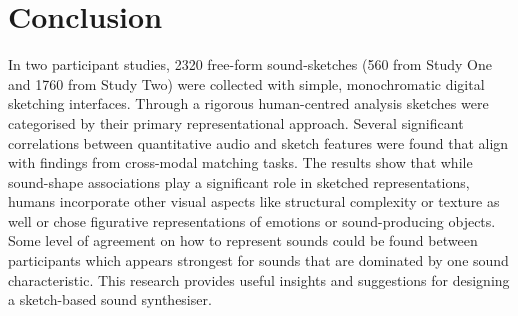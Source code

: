 \documentclass[]{interact}
\theoremstyle{plain}%
\theoremstyle{definition}
\theoremstyle{remark}
\begin{document}
\section{Conclusion}\label{sec:conclusion}
In two participant studies, 2320 free-form sound-sketches (560 from Study One and 1760 from Study Two) were collected with simple, monochromatic digital sketching interfaces. Through a rigorous human-centred analysis sketches were categorised by their primary representational approach. Several significant correlations between quantitative audio and sketch features were found that align with findings from cross-modal matching tasks. The results show that while sound-shape associations play a significant role in sketched representations, humans incorporate other visual aspects like structural complexity or texture as well or chose figurative representations of emotions or sound-producing objects. Some level of agreement on how to represent sounds could be found between participants which appears strongest for sounds that are dominated by one sound characteristic. This research provides useful insights and suggestions for designing a sketch-based sound synthesiser.





 
\end{document}
